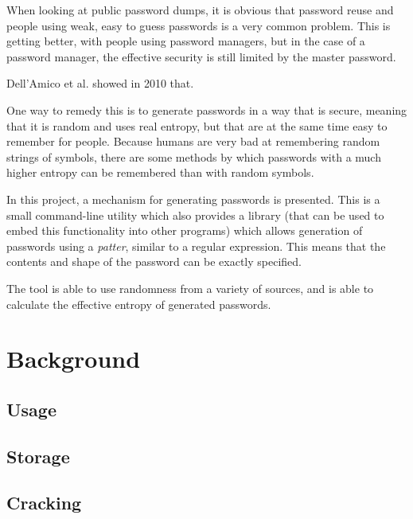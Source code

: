 \documentclass[a4paper,twocolumn]{article}
\begin{document}
When looking at public password dumps, it is obvious that password reuse and people using weak, easy to guess passwords is a very common problem. This is getting better, with people using password managers, but in the case of a password manager, the effective security is still limited by the master password.

Dell'Amico et al. showed in 2010 that\cite{5461951}. 


One way to remedy this is to generate passwords in a way that is secure, meaning that it is random and uses real entropy, but that are at the same time easy to remember for people. Because humans are very bad at remembering random strings of symbols, there are some methods by which passwords with a much higher entropy can be remembered than with random symbols.

In this project, a mechanism for generating passwords is presented. This is a small command-line utility which also provides a library (that can be used to embed this functionality into other programs) which allows generation of passwords using a \emph{patter}, similar to a regular expression. This means that the contents and shape of the password can be exactly specified.

The tool is able to use randomness from a variety of sources, and is able to calculate the effective entropy of generated passwords.

\section{Background}


\subsection{Usage}


\subsection{Storage}


\subsection{Cracking}
\end{document}

